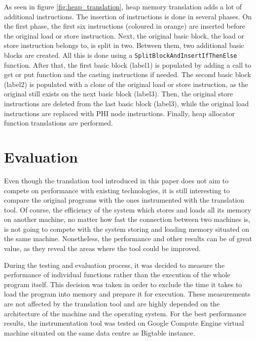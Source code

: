 \documentclass[bsc,frontabs,twoside,singlespacing,parskip,deptreport]{infthesis}     %
\begin{document}
As seen in figure \ref{fig:heap_translation}, heap memory translation adds a lot of additional instructions. The insertion of instructions is done in several phases. On the first phase, the first six instructions (coloured in orange) are inserted before the original load or store instruction. Next, the original basic block, the load or store instruction belongs to, is split in two. Between them, two additional basic blocks are created. All this is done using a \texttt{SplitBlockAndInsertIfThenElse} function. After that, the first basic block (label1) is populated by adding a call to get or put function and the casting instructions if needed. The second basic block (label2) is populated with a clone of the original load or store instruction, as the original still exists on the next basic block (label3). Then, the original store instructions are deleted from the last basic block (label3), while the original load instructions are replaced with PHI node instructions. Finally, heap allocator function translations are performed.

\chapter{Evaluation}

Even though the translation tool introduced in this paper does not aim to compete on performance with existing technologies, it is still interesting to compare the original  programs with the ones instrumented with the translation tool. Of course, the efficiency of the system which stores and loads all its memory on another machine, no matter how fast the connection between two machines is, is not going to compete with the system storing and loading memory situated on the same machine. Nonetheless, the performance and other results can be of great value, as they reveal the areas where the tool could be improved.

During the testing and evaluation process, it was decided to measure the performance of individual functions rather than the execution of the whole program itself. This decision was taken in order to exclude the time it takes to load the program into memory and prepare it for execution. These measurements are not affected by the translation tool and are highly depended on the architecture of the machine and the operating system. For the best performance results, the instrumentation tool was tested on Google Compute Engine virtual machine situated on the same data centre as Bigtable instance. 
\end{document}

